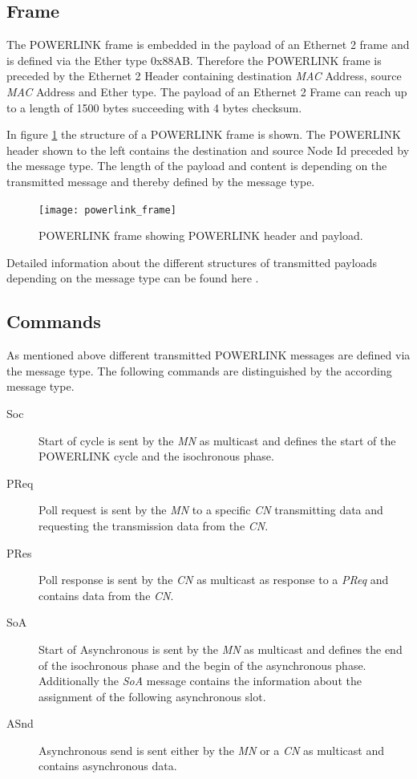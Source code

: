 \subsection{Frame}
\label{sec:oplk_powerlink_frame}
The POWERLINK frame is embedded in the payload of an Ethernet 2 frame and is defined via the Ether type 0x88AB.
Therefore the POWERLINK frame is preceded by the Ethernet 2 Header containing destination \emph{MAC} Address, source \emph{MAC} Address and Ether type.
The payload of an Ethernet 2 Frame can reach up to a length of 1500 bytes succeeding with 4 bytes checksum. \cite[section 3.2]{ethernet_ieee_2016} \cite[section 4.6.1]{epsg_epsg_2013}

In figure \ref{fig:powerlink_frame} the structure of a POWERLINK frame is shown.
The POWERLINK header shown to the left contains the destination and source Node Id preceded by the message type.
The length of the payload and content is depending on the transmitted message and thereby defined by the message type. \cite[section 4.6.1.1]{epsg_epsg_2013}

\begin{figure}
    \centering
    \texttt{[image: powerlink\_frame]}
    \caption{POWERLINK frame showing POWERLINK header and payload.}
    \label{fig:powerlink_frame}
\end{figure}

Detailed information about the different structures of transmitted payloads depending on the message type can be found here \cite[section 4.6.1.1.1]{epsg_epsg_2013}.

\subsection{Commands}
\label{sec:oplk_powerlink_commands}

As mentioned above different transmitted POWERLINK messages are defined via the message type.
The following commands are distinguished by the according message type.

\begin{description}
    \item[Soc] Start of cycle is sent by the \emph{MN} as multicast and defines the start of the POWERLINK cycle and the isochronous phase.
    \item[PReq] Poll request is sent by the \emph{MN} to a specific \emph{CN} transmitting data and requesting the transmission data from the \emph{CN}.
    \item[PRes] Poll response is sent by the \emph{CN} as multicast as response to a \emph{PReq} and contains data from the \emph{CN}.
    \item[SoA] Start of Asynchronous is sent by the \emph{MN} as multicast and defines the end of the isochronous phase and the begin of the asynchronous phase.
    Additionally the \emph{SoA} message contains the information about the assignment of the following asynchronous slot.
    \item[ASnd] Asynchronous send is sent either by the \emph{MN} or a \emph{CN} as multicast and contains asynchronous data.
\end{description}

